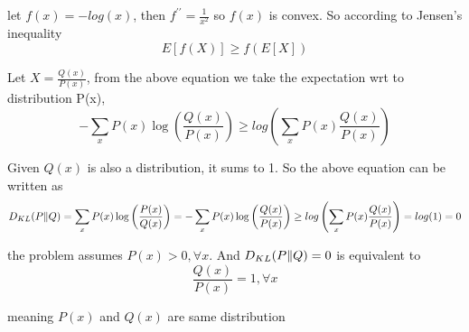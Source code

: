 \begin{answer}

let $f(x) = -log(x)$, then $f^{\prime\prime} = \frac{1}{x^2}$ so $f(x)$ is convex. So according to Jensen's inequality
\begin{equation}
   E[f(X)] \geq f(E[X])
\end{equation}

Let $X = \frac{Q(x)}{P(x)}$, from the above equation we take the expectation wrt to distribution P(x),
\begin{equation}
    - \sum_x P(x) \log\left(\frac{Q(x)}{P(x)}\right) \ge log\left( \sum_x P(x) \frac{Q(x)}{P(x)} \right)
\end{equation}

Given $Q(x)$ is also a distribution, it sums to 1. So the above equation can be written as 
\begin{equation}
    D_{KL}(P \| Q) = \sum_x P(x) \log\left(\frac{P(x)}{Q(x)}\right) = - \sum_x P(x) \log\left(\frac{Q(x)}{P(x)}\right) \ge log\left( \sum_x P(x) \frac{Q(x)}{P(x)} \right) = log(1) = 0
\end{equation}

the problem assumes $P(x)>0, \forall x$. And $D_{KL}(P \| Q) = 0$ is equivalent to
\begin{equation}
    \frac{Q(x)}{P(x)} = 1, \forall x
\end{equation}

meaning $P(x)$ and $Q(x)$ are same distribution 
\end{answer}
